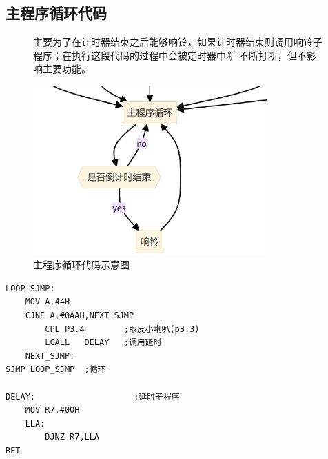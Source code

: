 \documentclass{article}
\begin{document}
\subsection{主程序循环代码}
\begin{figure}[H]
    \begin{minipage}{0.6\textwidth}
        \hspace*{2em}主要为了在计时器结束之后能够响铃，如果计时器结束则调用响铃子程序；在执行这段代码的过程中会被定时器中断
        不断打断，但不影响主要功能。
    \end{minipage}
    \begin{minipage}{0.35\textwidth}
        \centering
        \includegraphics[width=0.8\textwidth]{assets/image-20240501180521563.png}
        \caption{主程序循环代码示意图}
    \end{minipage}
\end{figure}
\begin{multicols}{3}
    \begin{lstlisting}
LOOP_SJMP:
    MOV A,44H
    CJNE A,#0AAH,NEXT_SJMP
	    CPL	P3.4        ;取反小喇叭(p3.3)
	    LCALL	DELAY   ;调用延时
    NEXT_SJMP:
SJMP LOOP_SJMP  ;循环

DELAY:                    ;延时子程序
    MOV	R7,#00H
    LLA:
        DJNZ R7,LLA
RET
    \end{lstlisting}
\end{multicols}
\end{document}
